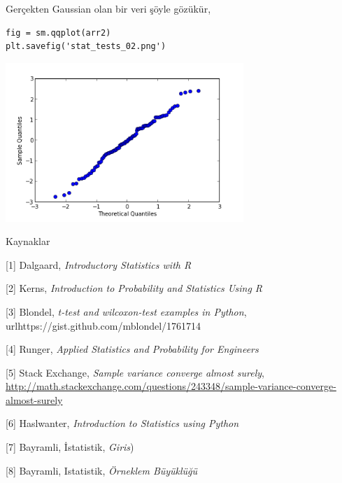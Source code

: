 \documentclass[12pt,fleqn]{article}\usepackage{../../common}
\begin{document}
Gerçekten Gaussian olan bir veri şöyle gözükür, 

\begin{verbatim}
fig = sm.qqplot(arr2)
plt.savefig('stat_tests_02.png')
\end{verbatim}
\includegraphics[height=6cm]{stat_tests_02.png}

Kaynaklar

[1] Dalgaard, {\em Introductory Statistics with R}

[2] Kerns, {\em Introduction to Probability and Statistics Using R}

[3] Blondel, {\em t-test and wilcoxon-test examples in Python}, url{https://gist.github.com/mblondel/1761714}

[4] Runger, {\em Applied Statistics and Probability for Engineers}

[5] Stack Exchange, {\em Sample variance converge almost surely}, \url{http://math.stackexchange.com/questions/243348/sample-variance-converge-almost-surely}

[6] Haslwanter, {\em Introduction to Statistics using Python}

[7] Bayramli, İstatistik, {\em Giris})

[8] Bayramli, Istatistik, {\em Örneklem Büyüklüğü}
\end{document}
